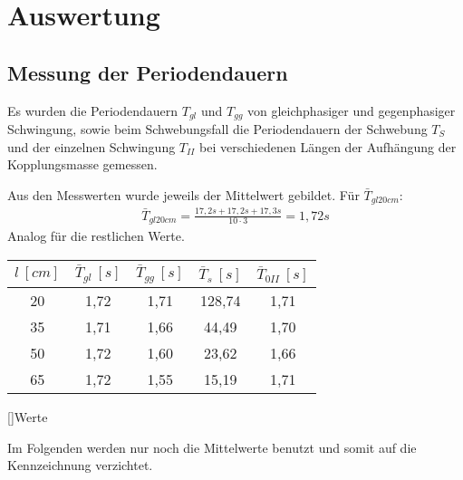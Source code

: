 \chapter{Auswertung}
	\section{Messung der Periodendauern}
    	Es wurden die Periodendauern $T_{gl}$ und $T_{gg}$ von gleichphasiger und gegenphasiger Schwingung, sowie beim Schwebungsfall die Periodendauern der Schwebung $T_S$ und der einzelnen Schwingung $T_{II}$ bei verschiedenen Längen der Aufhängung der Kopplungsmasse gemessen.
        
       	Aus den Messwerten wurde jeweils der Mittelwert gebildet.
        Für $\bar{T}_{gl 20cm}$:
        \begin{align*}
        	\bar{T}_{gl 20cm} = \frac{17,2s + 17,2s + 17,3s}{10 \cdot 3} = 1,72s
        \end{align*}
        Analog für die restlichen Werte.
        \begin{center}
        	\begin{tabular}{c||c|c|c|c}
            	$l~[cm] $ & $\bar{T}_{gl}~[s]$ & $\bar{T}_{gg}~[s]$ &	$\bar{T}_{s}~[s]$ & $\bar{T}_{0II}~[s]$ \\ \hline \hline
        		20	&1,72	&1,71	&128,74	&1,71 \\
				35	&1,71	&1,66	&44,49	&1,70 \\
				50	&1,72	&1,60	&23,62	&1,66 \\
				65	&1,72	&1,55	&15,19	&1,71 \\
        	\end{tabular}
            []{Werte}
        \end{center}
        Im Folgenden werden nur noch die Mittelwerte benutzt und somit auf die Kennzeichnung verzichtet.
